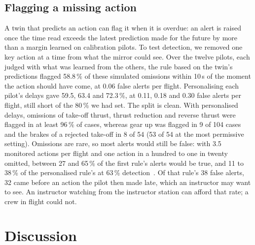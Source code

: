 \documentclass{llncs}
\begin{document}
\subsection{Flagging a missing action}

A twin that predicts an action can flag it when it is overdue: an alert is raised once the time read exceeds the latest prediction made
for the future by more than a margin learned on calibration pilots. To test detection, we removed one key action at a time from what the
mirror could see. Over the twelve pilots, each judged with what was learned from the others, the rule based on the twin's predictions
flagged 58.8\,\% of these simulated omissions within 10\,s of the moment the action should have come, at 0.06 false alerts per flight.
Personalising each pilot's delays gave 59.5, 63.4 and 72.3\,\%, at 0.11, 0.18 and 0.30 false alerts per flight, still short of the
80\,\% we had set. The split is clean. With personalised delays, omissions of take-off thrust, thrust reduction and reverse thrust were
flagged in at least 96\,\% of cases, whereas gear up was flagged in 9 of 104 cases and the brakes of a rejected take-off in 8 of 54
(53 of 54 at the most permissive setting). Omissions are rare, so most alerts would still be false: with 3.5 monitored actions per flight
and one action in a hundred to one in twenty omitted, between 27 and 65\,\% of the first rule's alerts would be true, and 11 to 38\,\% of
the personalised rule's at 63\,\% detection~\cite{parasuraman_alarm_1997}. Of that rule's 38 false alerts, 32 came before an action the
pilot then made late, which an instructor may want to see. An instructor watching from the instructor station can afford that rate; a
crew in flight could not.

\section{Discussion}
\label{sec:discussion}
\end{document}
